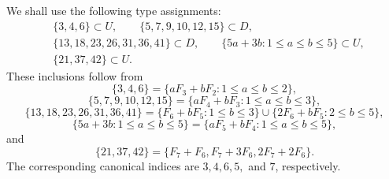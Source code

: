 \documentclass[11pt]{amsart}
\theoremstyle{definition}
\begin{document}
We shall use the following type assignments:
\begin{equation}\label{eq:small-types}
\begin{aligned}
&\{3,4,6\}\subset U,\qquad
\{5,7,9,10,12,15\}\subset D,\\
&\{13,18,23,26,31,36,41\}\subset D,\qquad
\{5a+3b:1\leq a\leq b\leq5\}\subset U,\\
&\{21,37,42\}\subset U.
\end{aligned}
\end{equation}
These inclusions follow from
\[
\{3,4,6\}
=\{aF_3+bF_2:1\leq a\leq b\leq2\},
\]
\[
\{5,7,9,10,12,15\}
=\{aF_4+bF_3:1\leq a\leq b\leq3\},
\]
\[
\{13,18,23,26,31,36,41\}
=\{F_6+bF_5:1\leq b\leq3\}
 \cup\{2F_6+bF_5:2\leq b\leq5\},
\]
\[
\{5a+3b:1\leq a\leq b\leq5\}
=\{aF_5+bF_4:1\leq a\leq b\leq5\},
\]
and
\[
\{21,37,42\}
=\{F_7+F_6,F_7+3F_6,2F_7+2F_6\}.
\]
The corresponding canonical indices are $3,4,6,5,$ and $7$,
respectively.
\end{document}
